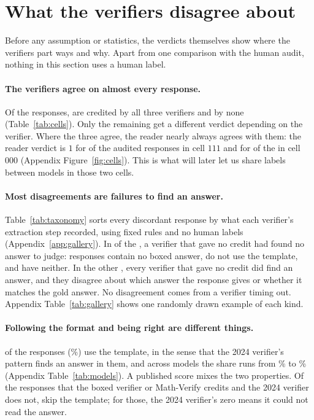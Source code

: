 \section{What the verifiers disagree about}
\label{sec:disagree}

Before any assumption or statistics, the verdicts themselves show where the verifiers part ways
and why. Apart from one comparison with the human audit, nothing in this section uses a human
label.

\paragraph{The verifiers agree on almost every response.}
Of the \NumRows{} responses, \CellAgreeAll{} are credited by all three verifiers and
\CellRejectAll{} by none (Table~\ref{tab:cells}). Only the remaining \RowsAnyDisagree{} get a
different verdict depending on the verifier. Where the three agree, the reader nearly always agrees
with them: the reader verdict is $1$ for \AuditCorrectAgreeAll{} of the \AuditNAgreeAll{} audited
responses in cell $111$ and for \AuditCorrectRejectAll{} of the \AuditNRejectAll{} in cell $000$
(Appendix Figure~\ref{fig:cells}). This is what will later let us share labels between models in
those two cells.



\paragraph{Most disagreements are failures to find an answer.}
Table~\ref{tab:taxonomy} sorts every discordant response by what each verifier's extraction step
recorded, using fixed rules and no human labels (Appendix~\ref{app:gallery}). In \TaxExtraction{}
of the \RowsAnyDisagree{}, a verifier that gave no credit had found no answer to judge:
\TaxBoxOnly{} responses contain no boxed answer, \TaxTemplateOnly{} do not use the template, and
\TaxTemplateBox{} have neither. In the other \TaxJudgement{}, every verifier
that gave no credit did find an answer, and they disagree about which answer the response gives or
whether it matches the gold answer. No disagreement comes from a verifier timing out. Appendix
Table~\ref{tab:gallery} shows one randomly drawn example of each kind.

\paragraph{Following the format and being right are different things.}
\TemplateCompliant{} of the \NumRows{} responses (\TemplateCompliantPct\%) use the template, in the
sense that the 2024 verifier's pattern finds an answer in them, and across models
the share runs from \TemplateMinPct\% to \TemplateMaxPct\% (Appendix Table~\ref{tab:models}). A
published score mixes the two properties. Of the \CreditedOthersNotEm{} responses that the boxed
verifier or Math-Verify credits and the 2024 verifier does not, \CreditedOthersNotEmNoncompliant{}
skip the template; for those, the 2024 verifier's zero means it could not read the answer.


